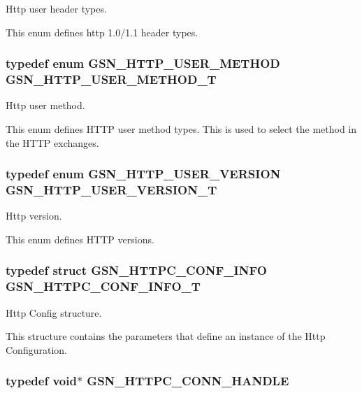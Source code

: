 Http user header types. 

This enum defines http 1.0/1.1 header types. \hypertarget{a00665_ga19c754176c7cf6f41749aa60c125ee7e}{
\subsubsection[{GSN\_\-HTTP\_\-USER\_\-METHOD\_\-T}]{\setlength{\rightskip}{0pt plus 5cm}typedef enum {\bf GSN\_\-HTTP\_\-USER\_\-METHOD}  {\bf GSN\_\-HTTP\_\-USER\_\-METHOD\_\-T}}}
\label{a00665_ga19c754176c7cf6f41749aa60c125ee7e}


Http user method. 

This enum defines HTTP user method types. This is used to select the method in the HTTP exchanges. \hypertarget{a00665_ga8a5357a42219f22430d5bf97d136092d}{
\subsubsection[{GSN\_\-HTTP\_\-USER\_\-VERSION\_\-T}]{\setlength{\rightskip}{0pt plus 5cm}typedef enum {\bf GSN\_\-HTTP\_\-USER\_\-VERSION}  {\bf GSN\_\-HTTP\_\-USER\_\-VERSION\_\-T}}}
\label{a00665_ga8a5357a42219f22430d5bf97d136092d}


Http version. 

This enum defines HTTP versions. \hypertarget{a00665_gaaf13b52fc631f1baf542db4a4403369c}{
\subsubsection[{GSN\_\-HTTPC\_\-CONF\_\-INFO\_\-T}]{\setlength{\rightskip}{0pt plus 5cm}typedef struct {\bf GSN\_\-HTTPC\_\-CONF\_\-INFO}  {\bf GSN\_\-HTTPC\_\-CONF\_\-INFO\_\-T}}}
\label{a00665_gaaf13b52fc631f1baf542db4a4403369c}


Http Config structure. 

This structure contains the parameters that define an instance of the Http Configuration. \hypertarget{a00665_ga873d4cd3603c5dd91494d571445cc7f7}{
\subsubsection[{GSN\_\-HTTPC\_\-CONN\_\-HANDLE}]{\setlength{\rightskip}{0pt plus 5cm}typedef void$\ast$ {\bf GSN\_\-HTTPC\_\-CONN\_\-HANDLE}}}
\label{a00665_ga873d4cd3603c5dd91494d571445cc7f7}


